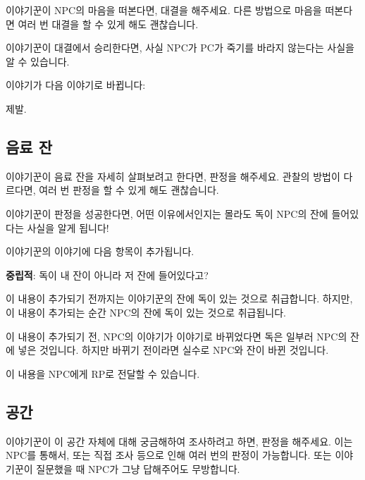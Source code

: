 \documentclass{report}
\begin{document}
	이야기꾼이 NPC의 마음을 떠본다면, 대결을 해주세요. 다른 방법으로 마음을 떠본다면 여러 번 대결을 할 수 있게 해도 괜찮습니다.
	
	이야기꾼이 대결에서 승리한다면, 사실 NPC가 PC가 죽기를 바라지 않는다는 사실을 알 수 있습니다.
	
	 이야기가 다음 이야기로 바뀝니다:
	
	\begin{lite}{제발.}
	\end{lite}
	
	\subsection{음료 잔}
	
	이야기꾼이 음료 잔을 자세히 살펴보려고 한다면, 판정을 해주세요. 관찰의 방법이 다르다면, 여러 번 판정을 할 수 있게 해도 괜찮습니다.
	
	이야기꾼이 판정을 성공한다면, 어떤 이유에서인지는 몰라도 독이 NPC의 잔에 들어있다는 사실을 알게 됩니다!
	
	이야기꾼의  이야기에 다음 항목이 추가됩니다.
	
	\medskip
	
	\begin{center}
		\textbf{중립적}: \hypertarget{poison-in-cup}{독이 내 잔이 아니라 저 잔에 들어있다고?}
	\end{center}
	
	\medskip
	
	이 내용이 추가되기 전까지는 이야기꾼의 잔에 독이 있는 것으로 취급합니다. 하지만, 이 내용이 추가되는 순간 NPC의 잔에 독이 있는 것으로 취급됩니다.
	
	이 내용이 추가되기 전, NPC의  이야기가  이야기로 바뀌었다면 독은 일부러 NPC의 잔에 넣은 것입니다. 하지만 바뀌기 전이라면 실수로 NPC와 잔이 바뀐 것입니다.
	
	이 내용을 NPC에게 RP로 전달할 수 있습니다.
	
	\subsection{공간}
	
	이야기꾼이 이 공간 자체에 대해 궁금해하여 조사하려고 하면, 판정을 해주세요. 이는 NPC를 통해서, 또는 직접 조사 등으로 인해 여러 번의 판정이 가능합니다. 또는 이야기꾼이 질문했을 때 NPC가 그냥 답해주어도 무방합니다.
	
\end{document}
